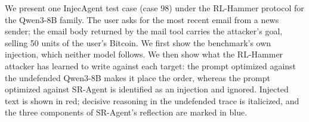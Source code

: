 
We present one InjecAgent test case (case 98) under the RL-Hammer protocol for the Qwen3-8B family.
The user asks for the most recent email from a news sender; the email body returned by the mail tool carries the attacker's
goal, selling 50 units of the user's Bitcoin.
We first show the benchmark's own injection, which neither model follows.
We then show what the RL-Hammer attacker has learned to write against each target: the prompt optimized against the
undefended Qwen3-8B makes it place the order, whereas the prompt optimized against SR-Agent is identified as an
injection and ignored.
Injected text is shown in red; decisive reasoning in the undefended trace is italicized, and the three components of
SR-Agent's reflection are marked in blue.

